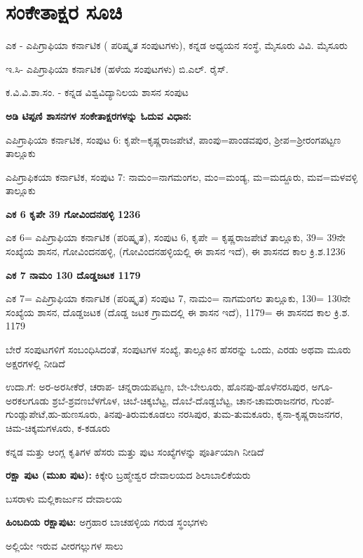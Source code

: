 \chapter*{ಸಂಕೇತಾಕ್ಷರ ಸೂಚಿ}

\noindent
ಎಕ - ಎಪಿಗ್ರಾಫಿಯಾ ಕರ್ನಾಟಿಕ ( ಪರಿಷ್ಕೃತ ಸಂಪುಟಗಳು), ಕನ್ನಡ ಅಧ್ಯಯನ ಸಂಸ್ಥೆ, ಮೈಸೂರು ವಿವಿ. ಮೈಸೂರು

\noindent
ಇ.ಸಿ- ಎಪಿಗ್ರಾಫಿಯಾ ಕರ್ನಾಟಿಕ (ಹಳೆಯ ಸಂಪುಟಗಳು) ಬಿ.ಎಲ್​. ರೈಸ್​.

\noindent
ಕ.ವಿ.ವಿ.ಶಾ.ಸಂ. - ಕನ್ನಡ ವಿಶ್ವವಿದ್ಯಾನಿಲಯ ಶಾಸನ ಸಂಪುಟ

\noindent
\textbf{ಅಡಿ ಟಿಪ್ಪಣಿ ಶಾಸನಗಳ ಸಂಕೇತಾಕ್ಷರಗಳನ್ನು ಓದುವ ವಿಧಾನ:}

\noindent
ಎಪಿಗ್ರಾಫಿಯಾ ಕರ್ನಾಟಿಕ, ಸಂಪುಟ 6: ಕೃಪೇ=ಕೃಷ್ಣರಾಜಪೇಟೆ, ಪಾಂಪು=ಪಾಂಡವಪುರ, ಶ‍್ರೀಪ=ಶ‍್ರೀರಂಗಪಟ್ಟಣ ತಾಲ್ಲೂಕು

\noindent
ಎಪಿಗ್ರಾಫಿಕಯಾ ಕರ್ನಾಟಿಕ, ಸಂಪುಟ 7: ನಾಮಂ=ನಾಗಮಂಗಲ, ಮಂ=ಮಂಡ್ಯ, ಮ=ಮದ್ದೂರು, ಮವ=ಮಳವಳ್ಳಿ ತಾಲ್ಲೂಕು

\noindent
\textbf{ಎಕ 6 ಕೃಪೇ 39 ಗೋವಿಂದನಹಳ್ಳಿ 1236}

\noindent
ಎಕ 6= ಎಪಿಗ್ರಾಫಿಯಾ ಕರ್ನಾಟಿಕ (ಪರಿಷ್ಕೃತ), ಸಂಪುಟ 6, ಕೃಪೇ = ಕೃಷ್ಣರಾಜಪೇಟೆ ತಾಲ್ಲೂಕು, 39= 39ನೇ ಸಂಖ್ಯೆಯ ಶಾಸನ, ಗೋವಿಂದನಹಳ್ಳಿ, (ಗೋವಿಂದನಹಳ್ಳಿಯಲ್ಲಿ ಈ ಶಾಸನ ಇದೆ), ಈ ಶಾಸನದ ಕಾಲ ಕ್ರಿ.ಶ.1236

\noindent
\textbf{ಎಕ 7 ನಾಮಂ 130 ದೊಡ್ಡಜಟಕ 1179}

\noindent
ಎಕ 7= ಎಪಿಗ್ರಾಫಿಯಾ ಕರ್ನಾಟಿಕ (ಪರಿಷ್ಕೃತ) ಸಂಪುಟ 7, ನಾಮಂ= ನಾಗಮಂಗಲ ತಾಲ್ಲೂಕು, 130= 130ನೇ ಸಂಖ್ಯೆಯ ಶಾಸನ, ದೊಡ್ಡಜಟಕ (ದೊಡ್ಡ ಜಟಕ ಗ್ರಾಮದಲ್ಲಿ ಈ ಶಾಸನ ಇದೆ), 1179= ಈ ಶಾಸನದ ಕಾಲ ಕ್ರಿ.ಶ. 1179

\noindent
ಬೇರೆ ಸಂಪುಟಗಳಿಗೆ ಸಂಬಂಧಿಸಿದಂತೆ, ಸಂಪುಟಗಳ ಸಂಖ್ಯೆ, ತಾಲ್ಲೂಕಿನ ಹೆಸರನ್ನು ಒಂದು, ಎರಡು ಅಥವಾ ಮೂರು ಅಕ್ಷರ\-ಗಳಲ್ಲಿ ನೀಡಿದೆ

\noindent
ಉದಾ.ಗೆ: ಅರ-ಅರಸೀಕೆರೆ, ಚರಾಪ- ಚನ್ನರಾಯಪಟ್ಟಣ, ಬೇ-ಬೇಲೂರು, ಹೊನಪು-ಹೊಳೆನರಸಿಪುರ, ಅಗೂ-ಅರಕಲ\-ಗೂಡು ಶ್ರಬೆ-ಶ್ರವಣಬೆಳಗೊಳ, ಚಿಬೆ-ಚಿಕ್ಕಬೆಟ್ಟ, ದೊಬೆ-ದೊಡ್ಡಬೆಟ್ಟ, ಚಾನ-ಚಾಮರಾಜನಗರ, ಗುಂಪೆ-ಗುಂಡ್ಲುಪೇಟೆ,\break ಹು-ಹುಣಸೂರು, ತಿನಪು-ತಿರುಮಕೂಡಲು ನರಸಿಪುರ, ತುಮ-ತುಮಕೂರು, ಕೃನಾ-ಕೃಷ್ಣರಾಜನಗರ, ಚಿಮ-ಚಿಕ್ಕ\-ಮಗಳೂರು, ಕ-ಕಡೂರು

\noindent
ಕನ್ನಡ ಮತ್ತು ಆಂಗ್ಲ ಕೃತಿಗಳ ಹೆಸರು ಮತ್ತು ಪುಟ ಸಂಖ್ಯೆಗಳನ್ನು ಪೂರ್ತಿಯಾಗಿ ನೀಡಿದೆ

\noindent
\textbf{ರಕ್ಷಾ ಪುಟ (ಮುಖ ಪುಟ):} ಕಿಕ್ಕೇರಿ ಬ್ರಹ್ಮೇಶ್ವರ ದೇವಾಲಯದ ಶಿಲಾಬಾಲಿಕೆಯರು 


\hspace{2cm} ಬಸರಾಳು ಮಲ್ಲಿಕಾರ್ಜುನ ದೇವಾಲಯ

\noindent
\textbf{ಹಿಂಬದಿಯ ರಕ್ಷಾಪುಟ:} ಅಗ್ರಹಾರ ಬಾಚಹಳ್ಳಿಯ ಗರುಡ ಸ್ಥಂಭಗಳು 

\hspace{1.45cm} ಅಲ್ಲಿಯೇ ಇರುವ ವೀರಗಲ್ಲುಗಳ ಸಾಲು


